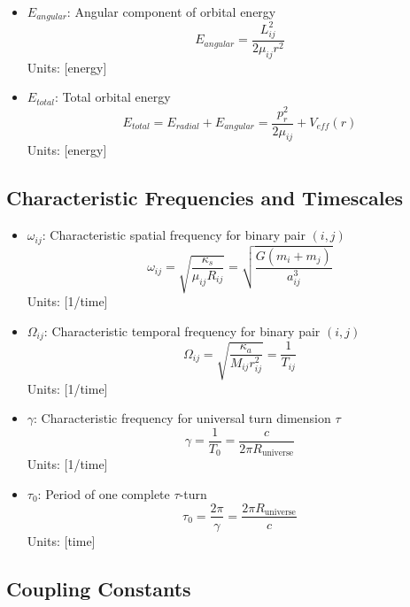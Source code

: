 \documentclass{article}
\begin{document}
\begin{itemize}
\item $E_{angular}$: Angular component of orbital energy
    \begin{equation}
    E_{angular} = \frac{L_{ij}^2}{2\mu_{ij}r^2}
    \end{equation}
    Units: [energy]
    
\item $E_{total}$: Total orbital energy
    \begin{equation}
    E_{total} = E_{radial} + E_{angular} = \frac{p_r^2}{2\mu_{ij}} + V_{eff}(r)
    \end{equation}
    Units: [energy]
\end{itemize}

\subsection{Characteristic Frequencies and Timescales}

\begin{itemize}
\item $\omega_{ij}$: Characteristic spatial frequency for binary pair $(i,j)$
    \begin{equation}
    \omega_{ij} = \sqrt{\frac{\kappa_s}{\mu_{ij} R_{ij}}} = \sqrt{\frac{G(m_i+m_j)}{a_{ij}^3}}
    \end{equation}
    Units: [1/time]
    
\item $\Omega_{ij}$: Characteristic temporal frequency for binary pair $(i,j)$
    \begin{equation}
    \Omega_{ij} = \sqrt{\frac{\kappa_a}{M_{ij} r_{ij}^2}} = \frac{1}{T_{ij}}
    \end{equation}
    Units: [1/time]
    
\item $\gamma$: Characteristic frequency for universal turn dimension $\tau$
    \begin{equation}
    \gamma = \frac{1}{T_0} = \frac{c}{2\pi R_{\text{universe}}}
    \end{equation}
    Units: [1/time]
    
\item $\tau_0$: Period of one complete $\tau$-turn
    \begin{equation}
    \tau_0 = \frac{2\pi}{\gamma} = \frac{2\pi R_{\text{universe}}}{c}
    \end{equation}
    Units: [time]
\end{itemize}

\subsection{Coupling Constants}
\end{document}
